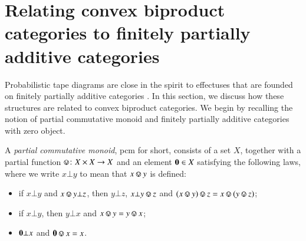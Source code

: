 
\section{Relating convex biproduct categories to finitely partially additive categories}\label{app:eff}
Probabilistic tape diagrams are close in the spirit to effectuses \cite{introductioneffectus} that are founded on finitely partially additive categories \cite{chophd,manes}.  In this section, we discuss how these structures are related to convex biproduct categories.
%
We begin by recalling the notion of partial commutative monoid and finitely partially additive categories with zero object. 


A \emph{partial commutative monoid}, pcm for short, consists of a set $X$, together with a partial function $\circledvee\colon X \times X \to X$ and an element $\mathbf{0} \in X$ satisfying the following laws, where we write $x\bot y$ to mean that $x\circledvee y$ is defined:
\begin{itemize}
\item[A)] if $x\bot y$ and $x\circledvee y \bot z$, then $y \bot z$, $x \bot y\circledvee z$ and $(x\circledvee y) \circledvee z = x\circledvee (y \circledvee z)$;
\item[C)] if $x\bot y$, then $y\bot x$ and $x \circledvee y = y \circledvee x$;
\item[U)] $\mathbf{0}\bot x$ and $\zeropcm\circledvee x =x$. 
\end{itemize}






